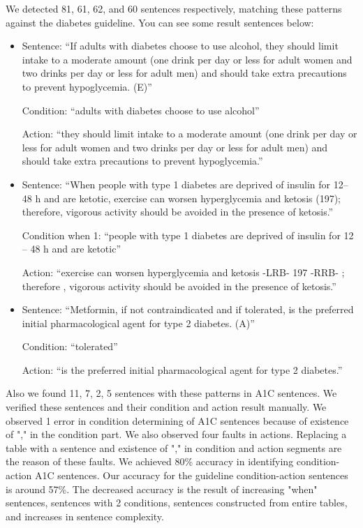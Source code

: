 \documentclass[12pt,letterpaper]{article}
\begin{document}
We detected 81, 61, 62, and 60 sentences respectively, matching these patterns against the diabetes guideline. You can see some result sentences below:

\begin{itemize}
\item Sentence: ``If adults with diabetes choose to use alcohol, they should limit intake to a moderate amount (one drink per day or less for adult women and two drinks per  day or less for  adult men) and should take extra precautions to prevent hypoglycemia. (E)''

Condition: ``adults with diabetes choose to use alcohol''

Action: ``they should limit intake to a moderate amount (one drink per day or less for adult women and two drinks per day or less for adult men) and should take extra precautions to prevent hypoglycemia.''

\item Sentence: ``When people with type 1 diabetes are deprived of insulin for 12– 48 h and are ketotic, exercise can worsen hyperglycemia and ketosis (197); therefore, vigorous activity should be avoided in the presence of ketosis.''

Condition when 1: ``people with type 1 diabetes are deprived of insulin for 12 -- 48 h and are ketotic''

Action: ``exercise can worsen hyperglycemia and ketosis -LRB- 197 -RRB- ; therefore , vigorous activity should be avoided in the presence of ketosis.''

\item Sentence: ``Metformin, if not contraindicated and if tolerated, is the preferred initial pharmacological agent for type 2 diabetes. (A)''

Condition: ``tolerated''

Action: ``is the preferred initial pharmacological agent for type 2 diabetes.''
\end{itemize}

Also we found 11, 7, 2, 5 sentences with these patterns in A1C sentences. We verified these sentences and their condition and action result manually. We observed 1 error in condition determining of A1C sentences because of existence of "," in the condition part. We also observed four faults in actions. Replacing a table with a sentence and existence of "," in condition and action segments are the reason of these faults. We achieved 80\% accuracy in identifying condition-action A1C sentences. Our accuracy for the guideline condition-action sentences is around 57\%. The decreased accuracy is the result of increasing "when" sentences, sentences with 2 conditions, sentences constructed from entire tables, and increases in sentence complexity.
\end{document}
